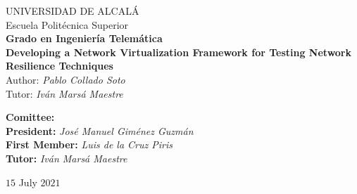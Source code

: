 \begin{center}
    {\Huge UNIVERSIDAD DE ALCALÁ}\\
    \vspace{0.5cm}
    {\huge Escuela Politécnica Superior}\\
    \vspace{1.5cm}
    {\Large \textbf{Grado en Ingeniería Telemática}}\\
    \vspace{3cm}
    {\Large \textbf{Developing a Network Virtualization Framework for Testing Network Resilience Techniques}}\\
    \vspace{1.5cm}
    {\large Author: \textit{Pablo Collado Soto}}\\
    \vspace{2.5mm}
    {\large Tutor: \textit{Iván Marsá Maestre}}\\
    \vspace{2cm}
\end{center}

\begin{flushleft}
    {\large \textbf{Comittee:}}\\
    \vspace{1cm}
    {\large \hspace{2cm} \textbf{President:} \hspace{9mm} \textit{José Manuel Giménez Guzmán}}\\
    \vspace{0.5cm}
    {\large \hspace{2cm} \textbf{First Member:} \textit{Luis de la Cruz Piris}}\\
    \vspace{0.5cm}
    {\large \hspace{2cm} \textbf{Tutor:} \hspace{18mm} \textit{Iván Marsá Maestre}}\\
    \vspace{6cm}
\end{flushleft}

\begin{center}
    $15$ July $2021$
\end{center}

\clearpage
